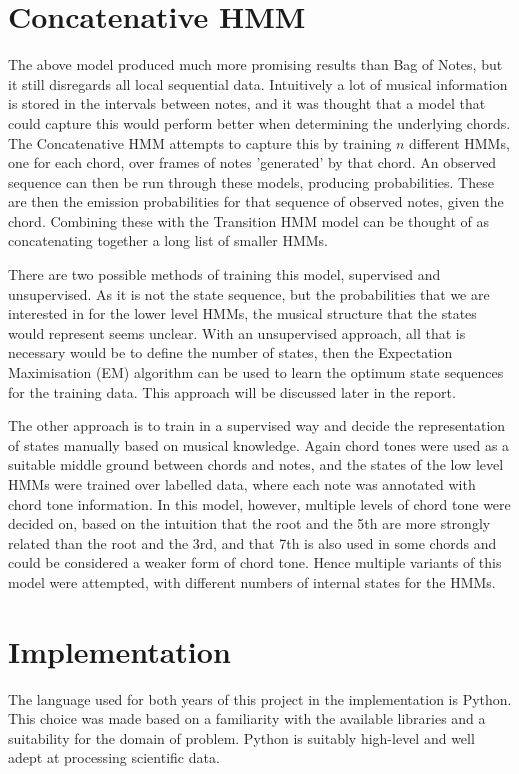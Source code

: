 \documentclass[bsc,singlespacing,logo, parskip, deptreport]{infthesis}
\begin{document}
\section{Concatenative HMM}

The above model produced much more promising results than Bag of Notes, but it still disregards all local sequential data. Intuitively a lot of musical information is stored in the intervals between notes, and it was thought that a model that could capture this would perform better when determining the underlying chords. The Concatenative HMM attempts to capture this by training $n$ different HMMs, one for each chord, over frames of notes 'generated' by that chord. An observed sequence can then be run through these models, producing probabilities. These are then the emission probabilities for that sequence of observed notes, given the chord. Combining these with the Transition HMM model can be thought of as concatenating together a long list of smaller HMMs. 

There are two possible methods of training this model, supervised and unsupervised. As it is not the state sequence, but the probabilities that we are interested in for the lower level HMMs, the musical structure that the states would represent seems unclear. With an unsupervised approach, all that is necessary would be to define the number of states, then the Expectation Maximisation (EM) algorithm can be used to learn the optimum state sequences for the training data. This approach will be discussed later in the report.

The other approach is to train in a supervised way and decide the representation of states manually based on musical knowledge. Again chord tones were used as a suitable middle ground between chords and notes, and the states of the low level HMMs were trained over labelled data, where each  note was annotated with chord tone information. In this model, however, multiple levels of chord tone were decided on, based on the intuition that the root and the 5th are more strongly related than the root and the 3rd, and that 7th is also used in some chords and could be considered a weaker form of chord tone. Hence multiple variants of this model were attempted, with different numbers of internal states for the HMMs.

\section{Implementation}

The language used for both years of this project in the implementation is Python. This choice was made based on a familiarity with the available libraries and a suitability for the domain of problem. Python is suitably high-level and well adept at processing scientific data.
\end{document}
